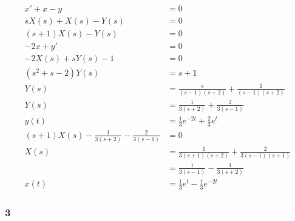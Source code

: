 \documentclass{article}
\begin{document}
\begin{align*}
  x' + x - y                                               & = 0                                                         \\
  s X(s) + X(s) - Y(s)                                     & = 0                                                         \\
  (s + 1) X(s) - Y(s)                                      & = 0                                                         \\
  -2 x + y'                                                & = 0                                                         \\
  -2 X(s) + s Y(s) - 1                                     & = 0                                                         \\
  (s^2 + s - 2) Y(s)                                       & = s + 1                                                     \\
  Y(s)                                                     & = \frac{s}{(s - 1) (s + 2)} + \frac{1}{(s - 1) (s + 2)}     \\
  Y(s)                                                     & = \frac{1}{3 (s + 2)} + \frac{2}{3 (s - 1)}                 \\
  y(t)                                                     & = \frac{1}{3} e^{-2 t} + \frac{2}{3} e^t                    \\
  (s + 1) X(s) - \frac{1}{3 (s + 2)} - \frac{2}{3 (s - 1)} & = 0                                                         \\
  X(s)                                                     & = \frac{1}{3 (s + 1) (s + 2)} + \frac{2}{3 (s - 1) (s + 1)} \\
                                                           & = \frac{1}{3 (s - 1)} - \frac{1}{3 (s + 2)}                 \\
  x(t)                                                     & = \frac{1}{3} e^t - \frac{1}{3} e^{-2t}
\end{align*}

\subsubsection{3}
\end{document}
